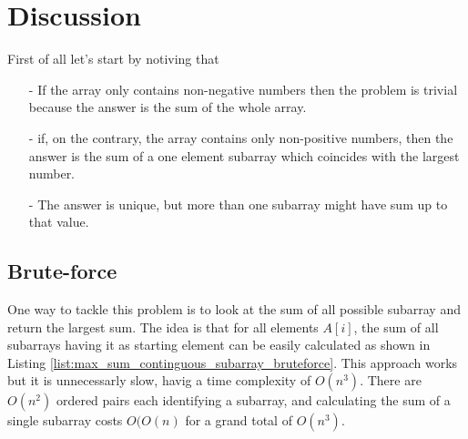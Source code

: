 \section{Discussion}
\label{max_sum_continguous_subarray:sec:discussion}
First of all let's start by notiving that 
\begin{itemize}
	\item[-] If the array only contains non-negative numbers then the problem is trivial because the answer is the sum of the whole array. 
	\item[-] if, on the contrary, the array contains only non-positive numbers, then the answer is the sum of a one element subarray which coincides with the largest number.
	\item[-] The answer is unique, but more than one subarray might have sum up to that value. 
\end{itemize}

\subsection{Brute-force}
\label{max_sum_continguous_subarray:sec:bruteforce}
One way to tackle this problem is to look at the sum of all possible subarray and return the largest sum. 
The idea is that for all elements $A[i]$, the sum of all subarrays having it as starting element can be easily calculated  as shown in Listing \ref{list:max_sum_continguous_subarray_bruteforce}. This approach works but it is unnecessarly slow, havig a time complexity of $O(n^3)$. There are $O(n^2)$ ordered pairs each identifying a subarray, and calculating the sum of a single subarray costs $O(O(n)$ for a grand total of $O(n^3)$. 



